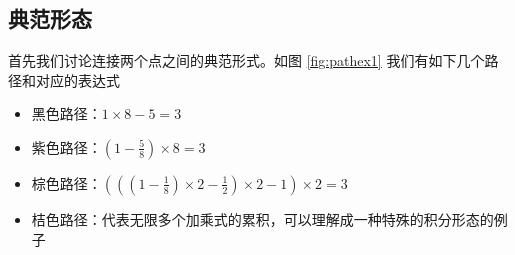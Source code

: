 \documentclass[a4paper,12pt]{article}
\numberwithin{definition}{section}
\numberwithin{lemma}{section}
\numberwithin{proposition}{section}
\numberwithin{theorem}{section}
\numberwithin{grammar}{section}
\numberwithin{program}{section}
\numberwithin{convention}{section}
\numberwithin{corollary}{section}
\begin{document}
\subsection{典范形态}

首先我们讨论连接两个点之间的典范形式。如图 \ref{fig:pathex1} 我们有如下几个路径和对应的表达式
\begin{itemize}
    \item 黑色路径：$1 \times 8 - 5 = 3$
    \item 紫色路径：$(1 - \frac{5}{8}) \times 8 = 3$
    \item 棕色路径：$(((1 - \frac{1}{8}) \times 2 - \frac{1}{2}) \times 2 - 1) \times 2 = 3$
    \item 桔色路径：代表无限多个加乘式的累积，可以理解成一种特殊的积分形态的例子
\end{itemize}
\end{document}
